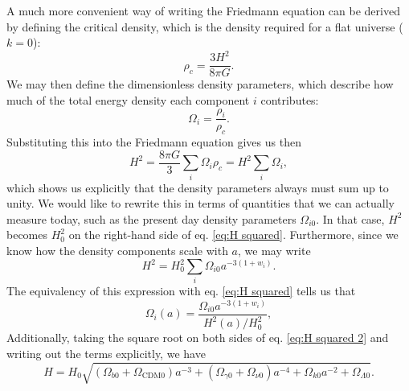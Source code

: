 \documentclass{aa}
\numberwithin{equation}{section}
\numberwithin{table}{section}
\numberwithin{figure}{section}
\begin{document}
A much more convenient way of writing the Friedmann equation can be derived by defining the critical density, which is the density required for a flat universe ($k=0$):
\begin{equation}
  \rho_c = \frac{3 H^2}{8 \pi G}.
\end{equation}
We may then define the dimensionless density parameters, which describe how much of the total energy density each component $i$ contributes:
\begin{equation}
  \Omega_i = \frac{\rho_{i}}{\rho_c}.
\end{equation}
Substituting this into the Friedmann equation gives us then
\begin{equation}
  H^2 = \frac{8\pi G}{3} \sum_i \Omega_{i}\rho_c = H^2\sum_i \Omega_{i}, \label{eq:H squared}
\end{equation}
which shows us explicitly that the density parameters always must sum up to unity. We would like to rewrite this in terms of quantities that we can actually measure today, such as the present day density parameters $\Omega_{i0}$. In that case, $H^2$ becomes $H_0^2$ on the right-hand side of eq. \eqref{eq:H squared}. Furthermore, since we know how the density components scale with $a$, we may write
\begin{equation}
  H^2 = H_0^2\sum_i \Omega_{i0}a^{-3(1+w_i)}. \label{eq:H squared 2}
\end{equation} 
The equivalency of this expression with eq. \eqref{eq:H squared} tells us that
\begin{equation}
  \Omega_{i}(a) = \frac{\Omega_{i0}a^{-3(1+w_i)}}{H^2(a)/H_0^2}, \label{eq:density params}
\end{equation}
Additionally, taking the square root on both sides of eq. \eqref{eq:H squared 2} and writing out the terms explicitly, we have
\begin{equation}
    H = H_0 \sqrt{(\Omega_{b0} + \Omega_{\text{CDM}0}) a^{-3} + (\Omega_{\gamma 0} + \Omega_{\nu 0}) a^{-4} + \Omega_{k0} a^{-2} + \Omega_{\Lambda 0}}.
\end{equation}
\end{document}
